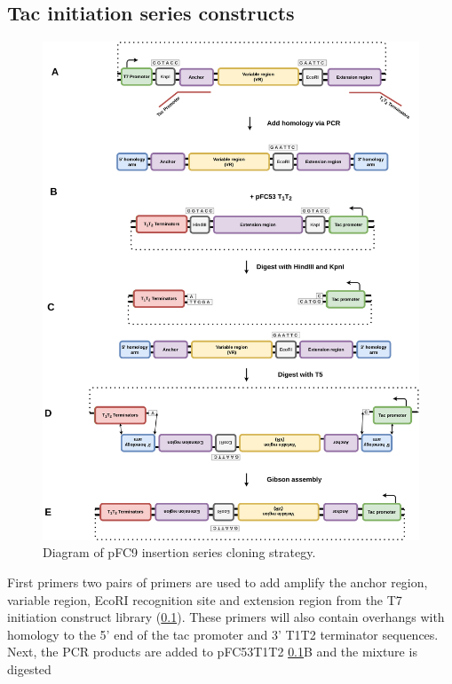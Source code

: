 \documentclass[11pt]{article}
\begin{document}
\subsection{Tac initiation series constructs}
\label{sec:tac-init}

\begin{figure}[H]
	\includegraphics[width=15cm]{images/cloning_diagrams/construct_diagrams-Tac-initiation-series.png}
	\centering
	\caption{Diagram of pFC9 insertion series cloning strategy.}
\end{figure}

First primers two pairs of primers are used to add amplify the anchor region, variable region, EcoRI recognition site and extension region from the T7 initiation construct library (\ref{sec:tac-init}). These primers will also contain overhangs with homology to the 5' end of the tac promoter and 3' T1T2 terminator sequences. Next, the PCR products are added to pFC53T1T2 \ref{sec:tac-init}B and the mixture is digested 
\end{document}
